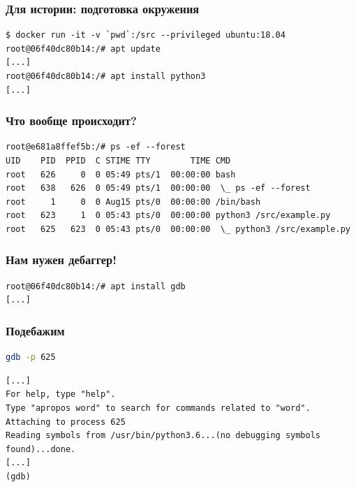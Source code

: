 \documentclass[10pt,pdf,utf8,aspectratio=169,xcolor=dvipsnames,x11names,center]{beamer}
\begin{document}
\begin{frame}[fragile]
  \frametitle{Для истории: подготовка окружения}
  \begin{lstlisting}[language={}]
$ docker run -it -v `pwd`:/src --privileged ubuntu:18.04
root@06f40dc80b14:/# apt update
[...]
root@06f40dc80b14:/# apt install python3
[...]
  \end{lstlisting}
\end{frame}

\begin{frame}[fragile]
  \frametitle{Что вообще происходит?}
  \begin{lstlisting}[language={}]
root@e681a8ffef5b:/# ps -ef --forest
UID    PID  PPID  C STIME TTY        TIME CMD
root   626     0  0 05:49 pts/1  00:00:00 bash
root   638   626  0 05:49 pts/1  00:00:00  \_ ps -ef --forest
root     1     0  0 Aug15 pts/0  00:00:00 /bin/bash
root   623     1  0 05:43 pts/0  00:00:00 python3 /src/example.py
root   625   623  0 05:43 pts/0  00:00:00  \_ python3 /src/example.py
  \end{lstlisting}
\end{frame}


\begin{frame}[fragile]
  \frametitle{Нам нужен дебаггер!}
  \begin{lstlisting}[language={}]
root@06f40dc80b14:/# apt install gdb
[...]
  \end{lstlisting}
\end{frame}

\begin{frame}[fragile]
  \frametitle{Подебажим}
  \begin{lstlisting}[language=bash]
gdb -p 625
  \end{lstlisting}
  \begin{lstlisting}[language={}]
[...]
For help, type "help".
Type "apropos word" to search for commands related to "word".
Attaching to process 625
Reading symbols from /usr/bin/python3.6...(no debugging symbols found)...done.
[...]
(gdb)
  \end{lstlisting}
\end{frame}
\end{document}
